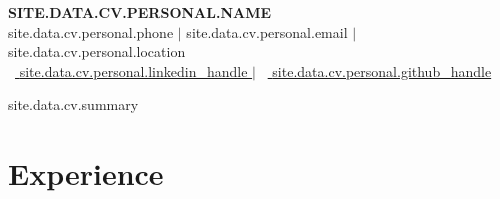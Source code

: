 \documentclass[10pt,letterpaper]{article}
\begin{document}
\begin{center}
    {\fontsize{18}{20}\selectfont\textbf{\MakeUppercase{ {{ site.data.cv.personal.name }} }}} \\[2pt]
    {{ site.data.cv.personal.phone }} $|$ {{ site.data.cv.personal.email }} $|$ {{ site.data.cv.personal.location }} \\[1pt]
    \faLinkedin\ \href{ {{ site.data.cv.personal.linkedin }} }{ {{ site.data.cv.personal.linkedin_handle }} } $|$
    \faGithub\ \href{ {{ site.data.cv.personal.github }} }{ {{ site.data.cv.personal.github_handle }} }
\end{center}


{\small {{ site.data.cv.summary }}}


\section{Experience}
\end{document}
